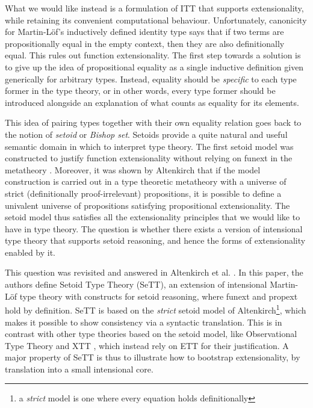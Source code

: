 \documentclass[a4paper,UKenglish,cleveref, autoref, thm-restate]{lipics-v2019}
\begin{document}
What we would like instead is a formulation of ITT that supports extensionality,
while retaining its convenient computational behaviour.
%
Unfortunately, canonicity for Martin-L{\"o}f's inductively defined
identity type says that if two terms are propositionally equal in the
empty context, then they are also definitionally equal. This rules out
function extensionality.
%
The first step towards a solution is to give up the idea of propositional
equality as a single inductive definition given generically for arbitrary
types. Instead, equality should be \emph{specific} to each type former in the
type theory, or in other words, every type former should be introduced alongside
an explanation of what counts as equality for its elements.

This idea of pairing types together with their own equality relation goes back
to the notion of \emph{setoid} or \emph{Bishop set}. Setoids provide a quite
natural and useful semantic domain in which to interpret type theory. The first
setoid model was constructed to justify function extensionality without relying
on funext in the metatheory \cite{hofmann}. Moreover, it was shown by Altenkirch
\cite{setoid99} that if the model construction is carried out in a type
theoretic metatheory with a universe of strict (definitionally proof-irrelevant)
propositions, it is possible to define a univalent universe of propositions
satisfying propositional extensionality. The setoid model thus satisfies all the
extensionality principles that we would like to have in type theory. The
question is whether there exists a version of intensional type theory that
supports setoid reasoning, and hence the forms of extensionality enabled by it.

This question was revisited and answered in Altenkirch et al. \cite{mpc19}. In
this paper, the authors define Setoid Type Theory (SeTT), an extension of
intensional Martin-L\"of type theory with constructs for setoid reasoning, where
funext and propext hold by definition. SeTT is based on the \emph{strict} setoid
model of Altenkirch\footnote{a \emph{strict} model is one where every equation
  holds definitionally}, which makes it possible to show consistency via a
syntactic translation. This is in contrast with other type theories based on the
setoid model, like Observational Type Theory \cite{alti:ott-conf, alti:ott-conf}
and XTT \cite{xtt}, which instead rely on ETT for their justification. A major
property of SeTT is thus to illustrate how to bootstrap extensionality, by
translation into a small intensional core.
\end{document}
